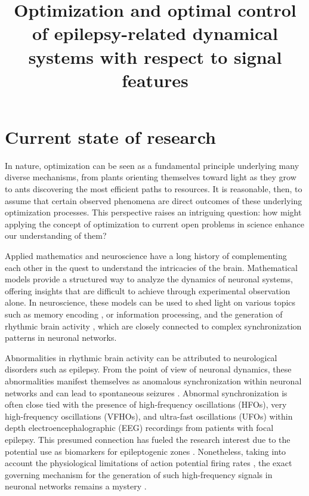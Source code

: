 \documentclass[a4paper,11pt]{scrartcl}
\title{Optimization and optimal control of epilepsy-related dynamical systems with respect to signal features}
\begin{document}
\maketitle
\tableofcontents

\newpage

\section{Current state of research}\label{sec:state}

In nature, optimization can be seen as a fundamental principle underlying many diverse mechanisms, from plants orienting themselves toward light as they grow to ants discovering the most efficient paths to resources. It is reasonable, then, to assume that certain observed phenomena are direct outcomes of these underlying optimization processes. This perspective raises an intriguing question: how might applying the concept of optimization to current open problems in science enhance our understanding of them?

Applied mathematics and neuroscience have a long history of complementing each other in the quest to understand the intricacies of the brain. Mathematical models provide a structured way to analyze the dynamics of neuronal systems, offering insights that are difficult to achieve through experimental observation alone. In neuroscience, these models can be used to shed light on various topics such as memory encoding \cite{Rolls1996, Guzman2016}, or information processing, and the generation of rhythmic brain activity \cite{Hoppensteadt1997, Izhikevich2006, Song2018}, which are closely connected to complex synchronization patterns in neuronal networks. 

Abnormalities in rhythmic brain activity can be attributed to neurological disorders such as epilepsy. From the point of view of neuronal dynamics, these abnormalities manifest themselves as anomalous synchronization within neuronal networks and can lead to spontaneous seizures \cite{Jiruska2013}. Abnormal synchronization is often close tied with the presence of high-frequency oscillations (HFOs), very high-frequency oscillations (VFHOs), and ultra-fast oscillations (UFOs) within depth electroencephalographic (EEG) recordings from patients with focal epilepsy. This presumed connection has fueled the research interest due to the potential use as biomarkers for epileptogenic zones \cite{Jacobs2008, Worrell2011, Staba2011, Jacobs2012, Zijlmans2012, Brazdil2017, Cimbalnik2018, Cimbalnik2020, Brazdil2023}. Nonetheless, taking into account the physiological limitations of action potential firing rates \cite{Augustine2004, Gabbiani2010}, the exact governing mechanism for the generation of such high-frequency signals in neuronal networks remains a mystery \cite{Jiruska2017}.
\end{document}
